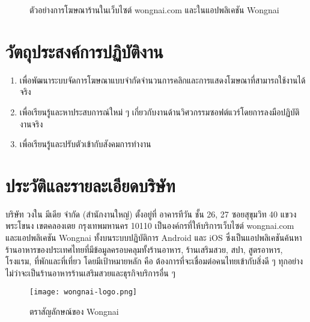 \begin{figure}[!h]
	\centering
	\caption{ตัวอย่างการโฆษณาร้านในเว็บไซต์ wongnai.com และในแอปพลิเคชัน Wongnai}
	\label{Fig:listingad}
\end{figure}

\section{วัตถุประสงค์การปฏิบัติงาน}
\begin{enumerate}
	\item เพื่อพัฒนาระบบจัดการโฆษณาแบบจำกัดจำนวนการคลิกและการแสดงโฆษณาที่สามารถใช้งานได้จริง
	\item เพื่อเรียนรู้และหาประสบการณ์ใหม่ ๆ เกี่ยวกับงานด้านวิศวกรรมซอฟต์แวร์โดยการลงมือปฏิบัติงานจริง
	\item เพื่อเรียนรู้และปรับตัวเข้ากับสังคมการทำงาน
\end{enumerate}

\section{ประวัติและรายละเอียดบริษัท}
บริษัท วงใน มีเดีย จำกัด (สำนักงานใหญ่) ตั้งอยู่ที่ อาคารทีวัน ชั้น 26, 27 ซอยสุขุมวิท 40 แขวงพระโขนง เขตคลองเตย กรุงเทพมหานคร 10110 เป็นองค์กรที่ให้บริการเว็บไซต์ wongnai.com และแอปพลิเคชัน Wongnai ทั้งบนระบบปฏิบัติการ Android และ iOS ซึ่งเป็นแอปพลิเคชันค้นหาร้านอาหารของประเทศไทยที่มีข้อมูลครอบคลุมทั้งร้านอาหาร, ร้านเสริมสวย, สปา, สูตรอาหาร, โรงแรม, ที่พักและที่เที่ยว โดยมีเป้าหมายหลัก คือ ต้องการที่จะเชื่อมต่อคนไทยเข้ากับสิ่งดี ๆ ทุกอย่างไม่ว่าจะเป็นร้านอาหารร้านเสริมสวยและธุรกิจบริการอื่น ๆ

\begin{figure}[!h]
	\centering
	\texttt{[image: wongnai-logo.png]}  
	\caption{ตราสัญลักษณ์ของ Wongnai}
	\label{Fig:wongnai-logo}
\end{figure}